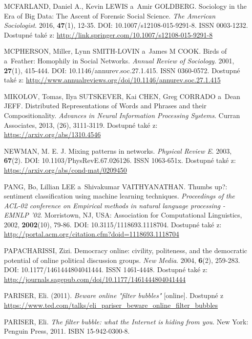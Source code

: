 \documentclass[12pt, a4paper]{article}
\numberwithin{equation}{section} 	%
\begin{document}
\begin{thebibliography}{99}
    MCFARLAND, Daniel A., Kevin LEWIS a~Amir GOLDBERG. Sociology in the Era of Big Data: The Ascent of Forensic Social Science. \textit{The American Sociologist}. 2016, \textbf{47}(1), 12-35. DOI: 10.1007/s12108-015-9291-8. ISSN 0003-1232. Dostupné také z: \url{http://link.springer.com/10.1007/s12108-015-9291-8}

    MCPHERSON, Miller, Lynn SMITH-LOVIN a~James M COOK. Birds of a~Feather: Homophily in Social Networks. \textit{Annual Review of Sociology}. 2001, \textbf{27}(1), 415-444. DOI: 10.1146/annurev.soc.27.1.415. ISSN 0360-0572. Dostupné také z: \url{http://www.annualreviews.org/doi/10.1146/annurev.soc.27.1.415}

    MIKOLOV, Tomas, Ilya SUTSKEVER, Kai CHEN, Greg CORRADO a~Dean JEFF. Distributed Representations of Words and Phrases and their Compositionality. \textit{Advances in Neural Information Processing Systems}. Curran Associates, 2013, (26), 3111-3119. Dostupné také z: \url{https://arxiv.org/abs/1310.4546}

    NEWMAN, M. E. J. Mixing patterns in networks. \textit{Physical Review E}. 2003, \textbf{67}(2). DOI: 10.1103/PhysRevE.67.026126. ISSN 1063-651x. Dostupné také z: \url{https://arxiv.org/abs/cond-mat/0209450}

    PANG, Bo, Lillian LEE a~Shivakumar VAITHYANATHAN. Thumbs up?: sentiment classification using machine learning techniques. \textit{Proceedings of the ACL-02 conference on Empirical methods in natural language processing - EMNLP '02}. Morristown, NJ, USA: Association for Computational Linguistics, 2002, \textbf{2002}(10), 79-86. DOI: 10.3115/1118693.1118704. Dostupné také z: \url{http://portal.acm.org/citation.cfm?doid=1118693.1118704}

    PAPACHARISSI, Zizi. Democracy online: civility, politeness, and the democratic potential of online political discussion groups. \textit{New Media}. 2004, \textbf{6}(2), 259-283. DOI: 10.1177/1461444804041444. ISSN 1461-4448. Dostupné také z: \url{http://journals.sagepub.com/doi/10.1177/1461444804041444}

    PARISER, Eli. (2011). \textit{Beware online "filter bubbles"} [online]. Dostupné z \url{https://www.ted.com/talks/eli_pariser_beware_online_filter_bubbles}

    PARISER, Eli. \textit{The filter bubble: what the Internet is hiding from you}. New York: Penguin Press, 2011. ISBN 15-942-0300-8.


\end{thebibliography}
\end{document}
